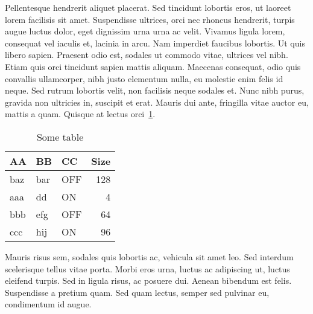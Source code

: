 Pellentesque hendrerit aliquet placerat. Sed tincidunt lobortis eros, ut laoreet
lorem facilisis sit amet. Suspendisse ultrices, orci nec rhoncus hendrerit,
turpis augue luctus dolor, eget dignissim urna urna ac velit. Vivamus ligula
lorem, consequat vel iaculis et, lacinia in arcu. Nam imperdiet faucibus
lobortis. Ut quis libero sapien. Praesent odio est, sodales ut commodo vitae,
ultrices vel nibh. Etiam quis orci tincidunt sapien mattis aliquam. Maecenas
consequat, odio quis convallis ullamcorper, nibh justo elementum nulla, eu
molestie enim felis id neque. Sed rutrum lobortis velit, non facilisis neque
sodales et. Nunc nibh purus, gravida non ultricies in, suscipit et erat. Mauris
dui ante, fringilla vitae auctor eu, mattis a quam. Quisque at lectus
orci~\ref{table:sometable}.

\begin{table}[ht]
	\begin{center}
		\caption{Some table}
		\begin{tabular}{@{}lllr@{}}
			\toprule
			AA & BB & CC & Size \\%
			\midrule
			baz & bar & OFF & 128 \\
			aaa & dd & ON & 4 \\
			bbb & efg & OFF & 64 \\
			ccc & hij & ON & 96 \\
			\bottomrule
		\end{tabular}
		\label{table:sometable}
	\end{center}
\end{table}

Mauris risus sem, sodales quis lobortis ac, vehicula sit amet leo. Sed interdum
scelerisque tellus vitae porta. Morbi eros urna, luctus ac adipiscing ut, luctus
eleifend turpis. Sed in ligula risus, ac posuere dui. Aenean bibendum est felis.
Suspendisse a pretium quam. Sed quam lectus, semper sed pulvinar eu, condimentum
id augue.~\cite{Doe:2009}


